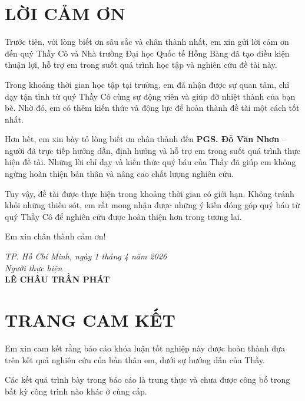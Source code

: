 \documentclass[13pt,a4paper,oneside]{extreport}
\begin{document}
\chapter*{LỜI CẢM ƠN}
\thispagestyle{plain}

Trước tiên, với lòng biết ơn sâu sắc và chân thành nhất, em xin gửi lời cảm ơn đến quý Thầy Cô và Nhà trường Đại học Quốc tế Hồng Bàng đã tạo điều kiện thuận lợi, hỗ trợ em trong suốt quá trình học tập và nghiên cứu đề tài này.

\noindent Trong khoảng thời gian học tập tại trường, em đã nhận được sự quan tâm, chỉ dạy tận tình từ quý Thầy Cô cùng sự động viên và giúp đỡ nhiệt thành của bạn bè. Nhờ đó, em có thêm kiến thức và động lực để hoàn thành đề tài một cách tốt nhất.

\noindent Hơn hết, em xin bày tỏ lòng biết ơn chân thành đến \textbf{PGS. Đỗ Văn Nhơn} -- người đã trực tiếp hướng dẫn, định hướng và hỗ trợ em trong suốt quá trình thực hiện đề tài. Những lời chỉ dạy và kiến thức quý báu của Thầy đã giúp em không ngừng hoàn thiện bản thân và nâng cao chất lượng nghiên cứu.

\noindent Tuy vậy, đề tài được thực hiện trong khoảng thời gian có giới hạn. Không tránh khỏi những thiếu sót, em rất mong nhận được những ý kiến đóng góp quý báu từ quý Thầy Cô để nghiên cứu được hoàn thiện hơn trong tương lai.

\noindent Em xin chân thành cảm ơn!

\vspace{2cm}
\begin{flushright}
    \textit{TP. Hồ Chí Minh, ngày 1 tháng 4 năm 2026}\\[0.5cm]
    \textit{Người thực hiện}\\[1.5cm]
    \textbf{LÊ CHÂU TRẦN PHÁT}
\end{flushright}
\clearpage

\chapter*{TRANG CAM KẾT}
\thispagestyle{plain}

Em xin cam kết rằng báo cáo khóa luận tốt nghiệp này được hoàn thành dựa trên kết quả nghiên cứu của bản thân em, dưới sự hướng dẫn của Thầy.

\noindent Các kết quả trình bày trong báo cáo là trung thực và chưa được công bố trong bất kỳ công trình nào khác ở cùng cấp.
\end{document}
